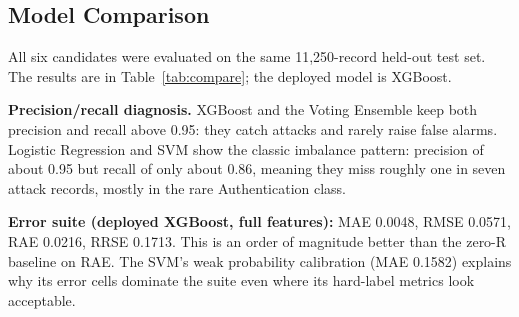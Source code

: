 \documentclass[12pt,a4paper]{article}
\begin{document}
\subsection{Model Comparison}
All six candidates were evaluated on the same 11,250-record held-out test set. The
results are in Table~\ref{tab:compare}; the deployed model is XGBoost.

\begin{table}[H]
\caption{Uniform comparison of all candidates (winner in bold)}
\label{tab:compare}
\centering
\scriptsize
\setlength{\tabcolsep}{3pt}
\end{table}

\textbf{Precision/recall diagnosis.} XGBoost and the Voting Ensemble keep both
precision and recall above 0.95: they catch attacks and rarely raise false alarms.
Logistic Regression and SVM show the classic imbalance pattern: precision of about
0.95 but recall of only about 0.86, meaning they miss roughly one in seven attack
records, mostly in the rare Authentication class.

\textbf{Error suite (deployed XGBoost, full features):} MAE 0.0048, RMSE 0.0571, RAE
0.0216, RRSE 0.1713. This is an order of magnitude better than the zero-R baseline on
RAE. The SVM's weak probability calibration (MAE 0.1582) explains why
its error cells dominate the suite even where its hard-label metrics look acceptable.
\end{document}
